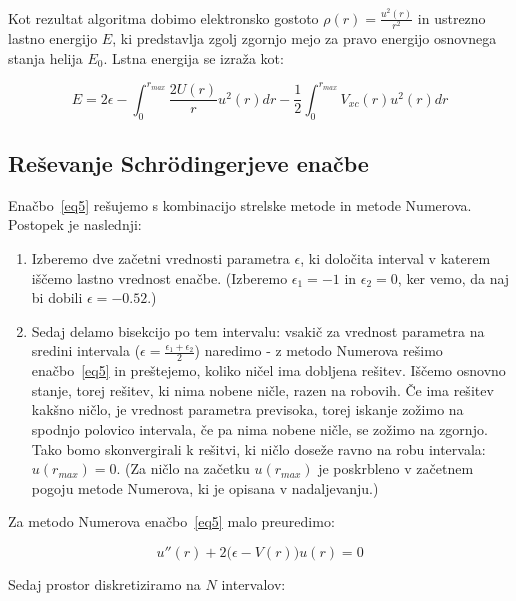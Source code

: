 \documentclass[a4paper]{article}
\newcommand{\half}{\frac{1}{2}}
\begin{document}
    Kot rezultat algoritma dobimo elektronsko gostoto $\rho(r) = \frac{u^2(r)}{r^2}$ in ustrezno lastno energijo $E$,
    ki predstavlja zgolj zgornjo mejo za pravo energijo osnovnega stanja helija $E_0$.
    Lstna energija se izraža kot:

    \begin{equation}\label{eq10}
    E = 2\epsilon - \int_0^{r_{max}} \frac{2U(r)}{r} u^2(r) dr - \half \int_0^{r_{max}} V_{xc}(r) u^2(r) dr
    \end{equation}

    \subsection{Reševanje Schr\"odingerjeve enačbe}

    Enačbo~\ref{eq5} rešujemo s kombinacijo strelske metode in metode Numerova.
    Postopek je naslednji:

    \begin{enumerate}
        \item Izberemo dve začetni vrednosti parametra $\epsilon$, ki določita interval v katerem iščemo
        lastno vrednost enačbe.
        (Izberemo $\epsilon_1 = -1$ in $\epsilon_2 = 0$, ker vemo, da naj bi dobili $\epsilon = -0.52$.)
        \item Sedaj delamo bisekcijo po tem intervalu: vsakič za vrednost parametra na sredini intervala
        ($\epsilon = \frac{\epsilon_1 + \epsilon_2}{2}$) naredimo  - z metodo Numerova rešimo
        enačbo~\ref{eq5} in preštejemo, koliko ničel ima dobljena rešitev.
        Iščemo osnovno stanje, torej rešitev, ki nima nobene ničle, razen na robovih.
        Če ima rešitev kakšno ničlo, je vrednost parametra previsoka, torej iskanje zožimo na spodnjo polovico intervala,
        če pa nima nobene ničle, se zožimo na zgornjo.
        Tako bomo skonvergirali k rešitvi, ki ničlo doseže ravno na robu intervala: $u(r_{max}) = 0$.
        (Za ničlo na začetku $u(r_{max})$ je poskrbleno v začetnem pogoju metode Numerova, ki je opisana v nadaljevanju.)
    \end{enumerate}

    Za metodo Numerova enačbo~\ref{eq5} malo preuredimo:

    \begin{equation}\label{eq11}
        u''(r) + 2\big(\epsilon - V(r)\big)u(r) = 0
    \end{equation}

    Sedaj prostor diskretiziramo na $N$ intervalov:
\end{document}
